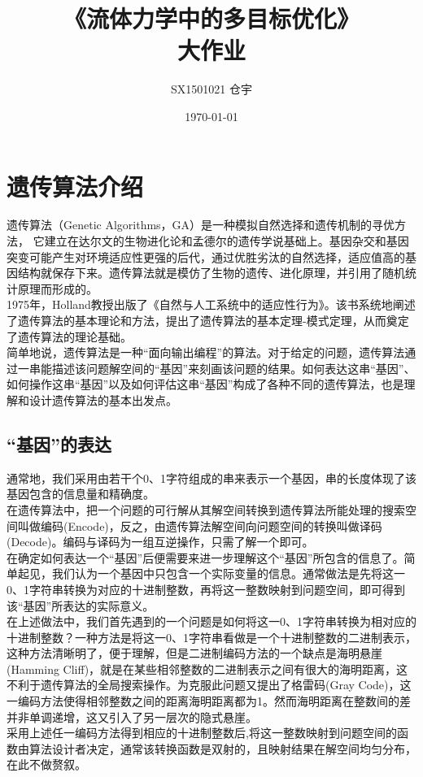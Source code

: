 \documentclass[UTF8]{ctexart}
\title{\heiti 《流体力学中的多目标优化》 \\ 大作业}
\author{SX1501021 仓宇}
\date{\today}
\begin{document}
\maketitle
\setcounter{page}{0}
\thispagestyle{empty}
\clearpage

\tableofcontents

\clearpage

\section{遗传算法介绍}
遗传算法（Genetic Algorithms，GA）是一种模拟自然选择和遗传机制的寻优方法， 它建立在达尔文的生物进化论和孟德尔的遗传学说基础上。基因杂交和基因突变可能产生对环境适应性更强的后代，通过优胜劣汰的自然选择，适应值高的基因结构就保存下来。遗传算法就是模仿了生物的遗传、进化原理，并引用了随机统计原理而形成的。\\
\indent 1975年，Holland教授出版了《自然与人工系统中的适应性行为》。该书系统地阐述了遗传算法的基本理论和方法，提出了遗传算法的基本定理-模式定理，从而奠定了遗传算法的理论基础。\\
\indent 简单地说，遗传算法是一种“面向输出编程”的算法。对于给定的问题，遗传算法通过一串能描述该问题解空间的“基因”来刻画该问题的结果。如何表达这串“基因”、如何操作这串“基因”以及如何评估这串“基因”构成了各种不同的遗传算法，也是理解和设计遗传算法的基本出发点。\\

\subsection{“基因”的表达}
通常地，我们采用由若干个0、1字符组成的串来表示一个基因，串的长度体现了该基因包含的信息量和精确度。\\
\indent 在遗传算法中，把一个问题的可行解从其解空间转换到遗传算法所能处理的搜索空间叫做编码(Encode)，反之，由遗传算法解空间向问题空间的转换叫做译码(Decode)。编码与译码为一组互逆操作，只需了解一个即可。\\
\indent 在确定如何表达一个“基因”后便需要来进一步理解这个“基因”所包含的信息了。简单起见，我们认为一个基因中只包含一个实际变量的信息。通常做法是先将这一0、1字符串转换为对应的十进制整数，再将这一整数映射到问题空间，即可得到该“基因”所表达的实际意义。\\
\indent 在上述做法中，我们首先遇到的一个问题是如何将这一0、1字符串转换为相对应的十进制整数？一种方法是将这一0、1字符串看做是一个十进制整数的二进制表示，这种方法清晰明了，便于理解，但是二进制编码方法的一个缺点是海明悬崖(Hamming Cliff)，就是在某些相邻整数的二进制表示之间有很大的海明距离，这不利于遗传算法的全局搜索操作。为克服此问题又提出了格雷码(Gray Code)，这一编码方法使得相邻整数之间的距离海明距离都为1。然而海明距离在整数间的差并非单调递增，这又引入了另一层次的隐式悬崖。\\
\indent 采用上述任一编码方法得到相应的十进制整数后,将这一整数映射到问题空间的函数由算法设计者决定，通常该转换函数是双射的，且映射结果在解空间均匀分布，在此不做赘叙。
\end{document}
